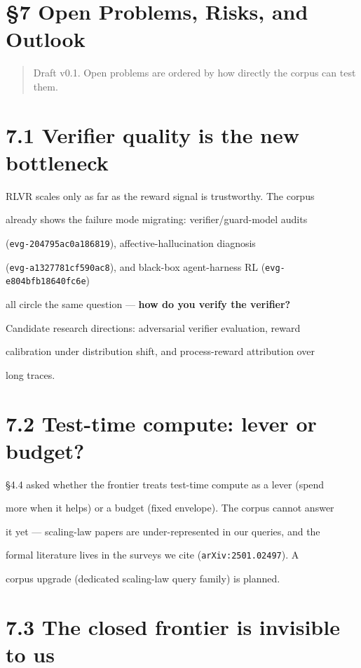 \documentclass[11pt]{article}
\begin{document}
\section*{\S7 Open Problems, Risks, and Outlook}

\begin{quote}Draft v0.1. Open problems are ordered by how directly the corpus can test them.\end{quote}

\section{7.1 Verifier quality is the new bottleneck}

RLVR scales only as far as the reward signal is trustworthy. The corpus

already shows the failure mode migrating: verifier/guard-model audits

(\texttt{evg-204795ac0a186819}), affective-hallucination diagnosis

(\texttt{evg-a1327781cf590ac8}), and black-box agent-harness RL (\texttt{evg-e804bfb18640fc6e})

all circle the same question --- \textbf{how do you verify the verifier?}

Candidate research directions: adversarial verifier evaluation, reward

calibration under distribution shift, and process-reward attribution over

long traces.


\section{7.2 Test-time compute: lever or budget?}

\S4.4 asked whether the frontier treats test-time compute as a lever (spend

more when it helps) or a budget (fixed envelope). The corpus cannot answer

it yet --- scaling-law papers are under-represented in our queries, and the

formal literature lives in the surveys we cite (\texttt{arXiv:2501.02497}). A

corpus upgrade (dedicated scaling-law query family) is planned.


\section{7.3 The closed frontier is invisible to us}
\end{document}
